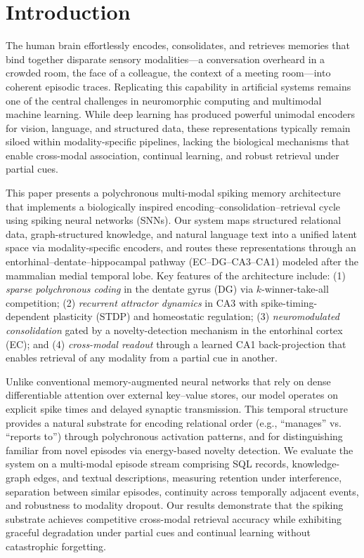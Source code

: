 \section{Introduction}

The human brain effortlessly encodes, consolidates, and retrieves memories that bind together disparate sensory modalities---a conversation overheard in a crowded room, the face of a colleague, the context of a meeting room---into coherent episodic traces. Replicating this capability in artificial systems remains one of the central challenges in neuromorphic computing and multimodal machine learning. While deep learning has produced powerful unimodal encoders for vision, language, and structured data, these representations typically remain siloed within modality-specific pipelines, lacking the biological mechanisms that enable cross-modal association, continual learning, and robust retrieval under partial cues.

This paper presents a polychronous multi-modal spiking memory architecture that implements a biologically inspired encoding--consolidation--retrieval cycle using spiking neural networks (SNNs). Our system maps structured relational data, graph-structured knowledge, and natural language text into a unified latent space via modality-specific encoders, and routes these representations through an entorhinal--dentate--hippocampal pathway (EC--DG--CA3--CA1) modeled after the mammalian medial temporal lobe. Key features of the architecture include: (1) \textit{sparse polychronous coding} in the dentate gyrus (DG) via $k$-winner-take-all competition; (2) \textit{recurrent attractor dynamics} in CA3 with spike-timing-dependent plasticity (STDP) and homeostatic regulation; (3) \textit{neuromodulated consolidation} gated by a novelty-detection mechanism in the entorhinal cortex (EC); and (4) \textit{cross-modal readout} through a learned CA1 back-projection that enables retrieval of any modality from a partial cue in another.

Unlike conventional memory-augmented neural networks that rely on dense differentiable attention over external key--value stores, our model operates on explicit spike times and delayed synaptic transmission. This temporal structure provides a natural substrate for encoding relational order (e.g., ``manages'' vs. ``reports to'') through polychronous activation patterns, and for distinguishing familiar from novel episodes via energy-based novelty detection. We evaluate the system on a multi-modal episode stream comprising SQL records, knowledge-graph edges, and textual descriptions, measuring retention under interference, separation between similar episodes, continuity across temporally adjacent events, and robustness to modality dropout. Our results demonstrate that the spiking substrate achieves competitive cross-modal retrieval accuracy while exhibiting graceful degradation under partial cues and continual learning without catastrophic forgetting.


